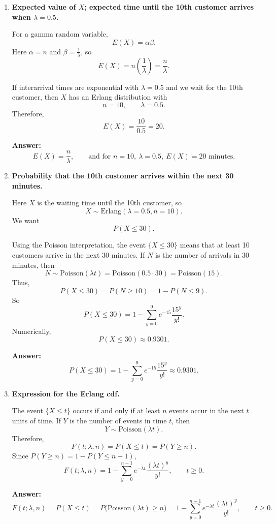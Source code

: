 \documentclass[11pt]{article}
\begin{document}
\begin{enumerate}
    \item[(a)] \textbf{Expected value of $X$; expected time until the 10th customer arrives when $\lambda=0.5$.}

    For a gamma random variable,
    \[
    E(X)=\alpha\beta.
    \]
    Here $\alpha=n$ and $\beta=\frac{1}{\lambda}$, so
    \[
    E(X)=n\left(\frac{1}{\lambda}\right)=\frac{n}{\lambda}.
    \]

    If interarrival times are exponential with $\lambda=0.5$ and we wait for the 10th customer, then $X$ has an Erlang distribution with
    \[
    n=10,\qquad \lambda=0.5.
    \]
    Therefore,
    \[
    E(X)=\frac{10}{0.5}=20.
    \]

    \textbf{Answer:} 
    \[
    E(X)=\frac{n}{\lambda},\qquad \text{and for } n=10,\ \lambda=0.5,\ E(X)=20\text{ minutes.}
    \]

    \item[(b)] \textbf{Probability that the 10th customer arrives within the next 30 minutes.}

    Here $X$ is the waiting time until the 10th customer, so
    \[
    X\sim \text{Erlang}(\lambda=0.5,n=10).
    \]
    We want
    \[
    P(X\le 30).
    \]

    Using the Poisson interpretation, the event $\{X\le 30\}$ means that at least 10 customers arrive in the next 30 minutes. If $N$ is the number of arrivals in 30 minutes, then
    \[
    N\sim \text{Poisson}(\lambda t)=\text{Poisson}(0.5\cdot 30)=\text{Poisson}(15).
    \]
    Thus,
    \[
    P(X\le 30)=P(N\ge 10)=1-P(N\le 9).
    \]
    So
    \[
    P(X\le 30)=1-\sum_{y=0}^{9} e^{-15}\frac{15^y}{y!}.
    \]
    Numerically,
    \[
    P(X\le 30)\approx 0.9301.
    \]

    \textbf{Answer:}
    \[
    P(X\le 30)=1-\sum_{y=0}^{9} e^{-15}\frac{15^y}{y!}\approx 0.9301.
    \]

    \item[(c)] \textbf{Expression for the Erlang cdf.}

    The event $\{X\le t\}$ occurs if and only if at least $n$ events occur in the next $t$ units of time. If $Y$ is the number of events in time $t$, then
    \[
    Y\sim \text{Poisson}(\lambda t).
    \]
    Therefore,
    \[
    F(t;\lambda,n)=P(X\le t)=P(Y\ge n).
    \]
    Since $P(Y\ge n)=1-P(Y\le n-1)$,
    \[
    F(t;\lambda,n)=1-\sum_{y=0}^{n-1} e^{-\lambda t}\frac{(\lambda t)^y}{y!}, \qquad t\ge 0.
    \]

    \textbf{Answer:}
    \[
    F(t;\lambda,n)=P(X\le t)=P\bigl(\text{Poisson}(\lambda t)\ge n\bigr)
    =1-\sum_{y=0}^{n-1} e^{-\lambda t}\frac{(\lambda t)^y}{y!}, \qquad t\ge 0.
    \]
\end{enumerate}
\end{document}
